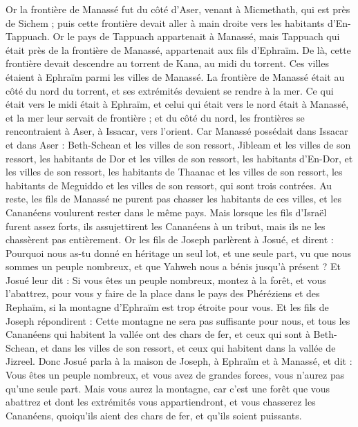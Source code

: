 \begin{multicols}{2}
Or la frontière de Manassé fut du côté d'Aser, venant à Micmethath, qui est près de Sichem ; puis cette frontière devait aller à main droite vers les habitants d'En-Tappuach.
Or le pays de Tappuach appartenait à Manassé, mais Tappuach qui était près de la frontière de Manassé, appartenait aux fils d'Ephraïm.
De là, cette frontière devait descendre au torrent de Kana, au midi du torrent. Ces villes étaient à Ephraïm parmi les villes de Manassé. La frontière de Manassé était au côté du nord du torrent, et ses extrémités devaient se rendre à la mer.
Ce qui était vers le midi était à Ephraïm, et celui qui était vers le nord était à Manassé, et la mer leur servait de frontière ; et du côté du nord, les frontières se rencontraient à Aser, à Issacar, vers l'orient.
Car Manassé possédait dans Issacar et dans Aser : Beth-Schean et les villes de son ressort, Jibleam et les villes de son ressort, les habitants de Dor et les villes de son ressort, les habitants d'En-Dor, et les villes de son ressort, les habitants de Thaanac et les villes de son ressort, les habitants de Meguiddo et les villes de son ressort, qui sont trois contrées.
Au reste, les fils de Manassé ne purent pas chasser les habitants de ces villes, et les Cananéens voulurent rester dans le même pays.
Mais lorsque les fils d'Israël furent assez forts, ils assujettirent les Cananéens à un tribut, mais ils ne les chassèrent pas entièrement.
Or les fils de Joseph parlèrent à Josué, et dirent : Pourquoi nous as-tu donné en héritage un seul lot, et une seule part, vu que nous sommes un peuple nombreux, et que Yahweh nous a bénis jusqu'à présent ?
Et Josué leur dit : Si vous êtes un peuple nombreux, montez à la forêt, et vous l'abattrez, pour vous y faire de la place dans le pays des Phéréziens et des Rephaïm, si la montagne d'Ephraïm est trop étroite pour vous.
Et les fils de Joseph répondirent : Cette montagne ne sera pas suffisante pour nous, et tous les Cananéens qui habitent la vallée ont des chars de fer, et ceux qui sont à Beth-Schean, et dans les villes de son ressort, et ceux qui habitent dans la vallée de Jizreel.
Donc Josué parla à la maison de Joseph, à Ephraïm et à Manassé, et dit : Vous êtes un peuple nombreux, et vous avez de grandes forces, vous n'aurez pas qu'une seule part.
Mais vous aurez la montagne, car c'est une forêt que vous abattrez et dont les extrémités vous appartiendront, et vous chasserez les Cananéens, quoiqu'ils aient des chars de fer, et qu'ils soient puissants.

\end{multicols}
